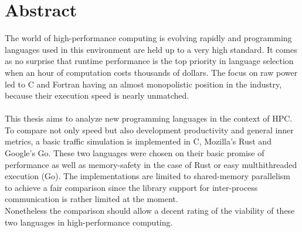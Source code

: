 \chapter*{Abstract}

\thispagestyle{empty}

The world of high-performance computing is evolving rapidly and programming languages used in
this environment are held up to a very high standard. It comes as no surprise that runtime performance
is the top priority in language selection when an hour of computation costs thousands of dollars.
The focus on raw power led to C and Fortran having an almost monopolistic position in the industry,
because their execution speed is nearly unmatched.
\\ \\
This thesis aims to analyze new programming languages in the context of HPC. To compare not only speed
but also development productivity and general inner metrics, a basic traffic simulation is implemented
in C, Mozilla's Rust and Google's Go. These two languages were chosen on their basic promise of
performance as well as memory-safety in the case of Rust or easy multhithreaded execution (Go).
The implementations are limited to shared-memory parallelism to achieve a fair comparison since the
library support for inter-process communication is rather limited at the moment.
\\
Nonetheless the comparison should allow a decent rating of the viability of these two languages in
high-performance computing.

